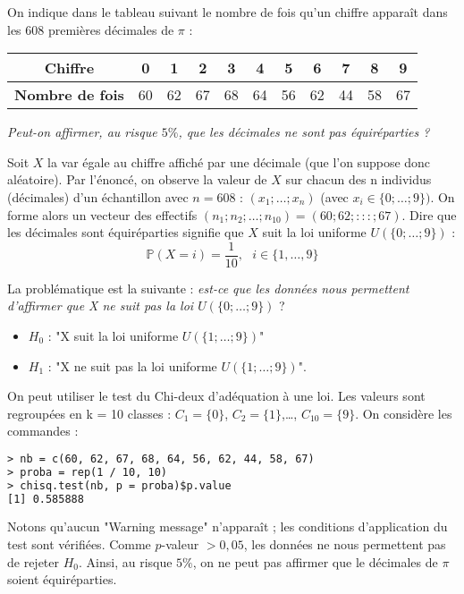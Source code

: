 

On indique dans le tableau suivant le nombre de fois qu'un chiffre apparaît dans les $608$ premières décimales de $\pi$ : 
\begin{center}
\begin{tabular}{|c|c|c|c|c|c|c|c|c|c|c|}
\hline
\textbf{Chiffre}        & 0  & 1  & 2  & 3  & 4  & 5  & 6  & 7  & 8  & 9  \\ \hline
\textbf{Nombre de fois} & 60 & 62 & 67 & 68 & 64 & 56 & 62 & 44 & 58 & 67 \\ \hline
\end{tabular}
\end{center}
\textit{Peut-on affirmer, au risque $5\%$, que les décimales ne sont pas équiréparties ?}



Soit $X$ la var égale au chiffre affiché par une décimale (que l'on suppose donc aléatoire).\newline
Par l'énoncé, on observe la valeur de $X$ sur chacun des n individus (décimales) d'un échantillon avec $n = 608$ : $(x_{1}; \dots ; x_{n})$ (avec $x_{i} \in \{0; \dots ; 9 \})$. On forme alors un vecteur des effectifs $(n_{1}; n_{2}; \dots ; n_{10}) = (60; 62; : : : ; 67)$. Dire que les décimales sont équiréparties signifie que $X$ suit la loi uniforme $\mathit{U}(\{0; \dots ; 9\})$ :
$$\mathbb{P}(X=i) = \frac{1}{10}, \textrm{ } i \in \{1,\dots, 9\}$$

La problématique est la suivante : \textit{est-ce que les données nous permettent d'affirmer que X ne suit pas la loi $\mathit{U}(\{0; \dots ; 9\})$} ?\newline
\\
\begin{itemize}
  \item $H_{0}$ : "X suit la loi uniforme $\mathit{U}(\{1; \dots ; 9\})$"
  \item $H_{1}$ : "X ne suit pas la loi uniforme $\mathit{U}(\{1; \dots ; 9\})$".
\end{itemize}
On peut utiliser le test du Chi-deux d'adéquation à une loi. Les valeurs sont regroupées en k = 10
classes : $C_{1} = \{0\}$, $C_{2} = \{1\}$,\dots, $C_{10} = \{9\}$.\newline
On considère les commandes :
\begin{lstlisting}[language=html]
> nb = c(60, 62, 67, 68, 64, 56, 62, 44, 58, 67)
> proba = rep(1 / 10, 10)
> chisq.test(nb, p = proba)$p.value
[1] 0.585888
\end{lstlisting}
Notons qu'aucun "Warning message" n'apparaît ; les conditions d'application du test sont vérifiées.\newline
Comme $p$-valeur $> 0,05$, les données ne nous permettent pas de rejeter $H_{0}$. Ainsi, au risque $5\%$, on ne peut pas affirmer que le décimales de $\pi$ soient équiréparties.

